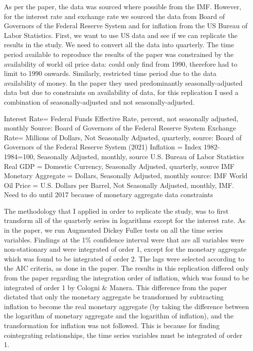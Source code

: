 \documentclass[11pt,preprint, authoryear]{elsarticle}
\numberwithin{equation}{section}
\numberwithin{figure}{section}
\numberwithin{table}{section}
\begin{document}
As per the paper, the data was sourced where possible from the IMF.
However, for the interest rate and exchange rate we sourced the data
from Board of Governors of the Federal Reserve System and for inflation
from the US Bureau of Labor Statistics. First, we want to use US data
and see if we can replicate the results in the study. We need to convert
all the data into quarterly. The time period available to reproduce the
results of the paper was constrained by the availability of world oil
price data: could only find from 1990, therefore had to limit to 1990
onwards. Similarly, restricted time period due to the data availability
of money. In the paper they used predominantly seasonally-adjusted data
but due to constraints on availability of data, for this replication I
used a combination of seasonally-adjusted and not seasonally-adjusted.

Interest Rate= Federal Funds Effective Rate, percent, not seasonally
adjusted, monthly Source: Board of Governors of the Federal Reserve
System Exchange Rate= Millions of Dollars, Not Seasonally Adjusted,
quarterly, source: Board of Governors of the Federal Reserve System
(2021) Inflation = Index 1982-1984=100, Seasonally Adjusted, monthly,
source U.S. Bureau of Labor Statistics Real GDP = Domestic Currency,
Seasonally Adjusted, quarterly, source IMF Monetary Aggregate = Dollars,
Seasonally Adjusted, monthly source: IMF World Oil Price = U.S. Dollars
per Barrel, Not Seasonally Adjusted, monthly, IMF. Need to do until 2017
because of monetary aggregate data constraints

The methodology that I applied in order to replicate the study, was to
first transform all of the quarterly series in logarithms except for the
interest rate. As in the paper, we run Augmented Dickey Fuller tests on
all the time series variables. Findings at the 1\% confidence interval
were that are all variables were non-stationary and were integrated of
order 1, except for the monetary aggregate which was found to be
integrated of order 2. The lags were selected according to the AIC
criteria, as done in the paper. The results in this replication differed
only from the paper regarding the integration order of inflation, which
was found to be integrated of order 1 by Cologni \& Manera. This
difference from the paper dictated that only the monetary aggregate be
transformed by subtracting inflation to become the real monetary
aggregate (by taking the difference between the logarithm of monetary
aggregate and the logarithm of inflation), and the transformation for
inflation was not followed. This is because for finding cointegrating
relationships, the time series variables must be integrated of order 1.
\end{document}
